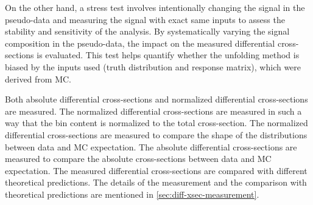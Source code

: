 On the other hand, a stress test involves intentionally changing the signal in the pseudo-data and measuring the signal with exact same inputs to assess the stability and sensitivity of the analysis. By systematically varying the signal composition in the pseudo-data, the impact on the measured differential cross-sections is evaluated. This test helps quantify whether the unfolding method is biased by the inputs used (truth distribution and response matrix), which were derived from MC.

Both absolute differential cross-sections and normalized differential cross-sections are measured. The normalized differential cross-sections are measured in such a way that the bin content is normalized to the total cross-section. The normalized differential cross-sections are measured to compare the shape of the distributions between data and MC expectation. The absolute differential cross-sections are measured to compare the absolute cross-sections between data and MC expectation. The measured differential cross-sections are compared with different theoretical predictions. The details of the measurement and the comparison with theoretical predictions are mentioned in \cref{sec:diff-xsec-measurement}.